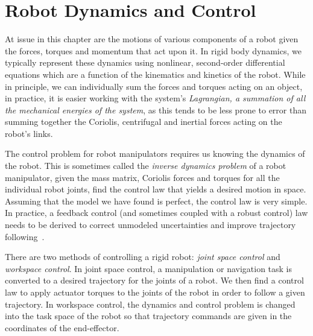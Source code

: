 \section{Robot Dynamics and Control}
%
At issue in this chapter are the motions of various components of a robot given the forces, torques and momentum that act upon it. In rigid body dynamics, we typically represent these dynamics using nonlinear, second-order differential equations which are a function of the kinematics and kinetics of the robot.  While in principle, we can individually sum the forces and torques acting on an object, in practice, it is easier working with the system's \textit{Lagrangian, a summation of all the mechanical energies of the system}, as this tends to be less prone to error than summing together the Coriolis, centrifugal and inertial forces acting on the robot's links. 

The control problem for robot manipulators requires us knowing the dynamics of the robot. This is sometimes called the \textit{inverse dynamics problem} of a robot manipulator, \ie given the mass matrix, Coriolis forces and torques for all the individual robot joints, find the control law that yields a desired motion in space. Assuming that the model we have found is perfect, the control law is very simple. In practice, a feedback control (and sometimes coupled with a robust control) law needs to be derived to correct unmodeled uncertainties and improve trajectory following~\cite{Ogunmolu18IROS}.

There are two methods of controlling a rigid robot: \textit{joint space control} and \textit{workspace control}. In joint space control, a manipulation or navigation task is converted to a desired trajectory for the joints of a robot. We then find a control law to apply actuator torques to the joints of the robot in order to follow a given trajectory. In workspace control, the dynamics and control problem is changed into the task space of the robot so that trajectory commands are given in the coordinates of the end-effector.

